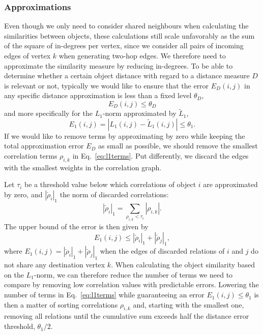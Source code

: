 \documentclass[conference]{IEEEtran}
\newcommand{\rn}[1]{\rho_{#1}}
\newcommand{\mrn}[1]{\tau_{#1}}
\newcommand{\drns}[1]{|\check{\rho}_{#1}|_1}
\newcommand{\nm}[1]{L_1(#1)}
\newcommand{\anm}[1]{\tilde{L}_1(#1)}
\begin{document}
\subsubsection{Approximations}
\label{subsec:approximations}
Even though we only need to consider shared neighbours when calculating the similarities between objects, these
calculations still scale unfavorably as the sum of the square of in-degrees per vertex, since we consider all pairs of
incoming edges of vertex $k$ when generating two-hop edges. We therefore need to approximate the similarity measure by
reducing in-degrees. To be able to determine whether a certain object distance with regard to a distance measure $D$ is
relevant or not, typically we would like to ensure that the error $E_{D}(i,j)$ in any specific distance approximation
is less than a fixed level $\theta_D$,
\begin{equation}
E_{D}(i,j) \leq \theta_D
\end{equation}
and more specifically for the $L_1$-norm approximated by $\tilde{L}_1$,
\begin{equation}
E_1(i,j) = | \nm{i,j}  - \anm{i,j}  | \leq \theta_1.
\end{equation}
If we would like to remove terms by approximating by zero while keeping the total approximation error $E_D$ 
as small as possible, we should remove the smallest correlation terms $\rn{i,k}$ in Eq.\ \ref{eq:l1terms}. Put differently,
we discard the edges with the smallest weights in the correlation graph.

Let $\mrn{i}$ be a threshold value below which correlations of object $i$ are approximated by zero, and $\drns{i}$ the 
norm of discarded correlations:
\begin{equation} \label{}
\drns{i} = \sum_{ \rn{i,k} < \mrn{i}} |\rn{i,k}|.
\end{equation}
The upper bound of the error is then given by
\begin{equation} \label{eq:errbound}
E_1(i,j) \leq \drns{i} + \drns{j},
\end{equation}
where $E_1(i,j)=\drns{i} + \drns{j}$ when the edges of discarded relations of $i$ and $j$ do not share any destination
vertex $k$. When calculating the object similarity based on the $L_1$-norm, we can therefore reduce the number of
terms we need to compare by removing low correlation values with predictable errors. Lowering the number of terms in
Eq.\ \ref{eq:l1terms} while guaranteeing an error $E_1(i,j) \leq \theta_1$ is then a matter of sorting correlations
$\rn{i,k}$ and, starting with the smallest one, removing all relations until the cumulative sum exceeds half the
distance error threshold, $\theta_1/2$.
\end{document}
